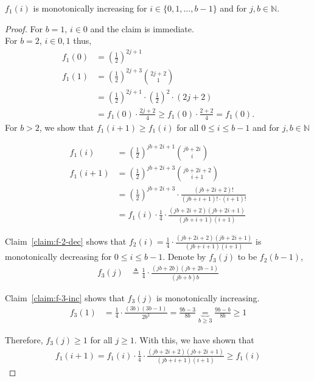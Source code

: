 \begin{claim}\label{claim:holes-pi-mono}
$f_1(i)$ is monotonically increasing for $i \in \{0,1,\dots,b-1\}$ and for $j,b \in \mathds{N}$. 
\end{claim}

\begin{proof}
For $b=1$, $i \in {0}$ and the claim is immediate.\\
For $b=2$, $i \in {0,1}$ thus,
\begin{align*}
    f_1(0) &= \left(\frac{1}{2}\right)^{2j+1} \\
    f_1(1) &= \left(\frac{1}{2}\right)^{2j+3} {{2j+2} \choose 1} \\
            &= \left(\frac{1}{2}\right)^{2j+1} \cdot \left(\frac{1}{2}\right)^{2} \cdot (2j+2)\\
            &= f_1(0) \cdot \frac{2j+2}{4} \geq f_1(0) \cdot \frac{2+2}{4} = f_1(0).
\end{align*}
For $b>2$, we show that $f_1(i+1)\geq f_1(i)$ for all $0 \leq i \leq b-1$ and for $j,b \in \mathds{N}$

\begin{align*}
    f_1(i) &= \left(\frac{1}{2}\right)^{jb + 2i +1} {{jb+2i} \choose {i}} \\
    f_1(i+1) &= \left(\frac{1}{2}\right)^{jb + 2i +3} {{jb+2i+2} \choose {i+1}} \\
    &= \left(\frac{1}{2}\right)^{jb + 2i +3} \cdot \frac{(jb+2i+2)!}{(jb+i+1)!\cdot(i+1)!} \\
    &= f_1(i) \cdot \frac{1}{4} \cdot \frac{(jb+2i+2)(jb+2i+1)}{(jb+i+1)(i+1)}
\end{align*}

Claim~\ref{claim:f-2-dec} shows that $f_2(i) = \frac{1}{4} \cdot \frac{(jb+2i+2)(jb+2i+1)}{(jb+i+1)(i+1)} $ is monotonically decreasing for $0\leq{i}\leq{b-1}$. 
Denote by $f_3(j)$ to be $f_2(b-1)$,
\begin{align}
    f_3(j) &\triangleq \frac{1}{4} \cdot \frac{(jb+2b)(jb+2b-1)}{(jb+b)b}
\end{align}

Claim~\ref{claim:f-3-inc} shows that $f_3(j)$ is monotonically increasing. 
\begin{align*}
    f_3(1) &= \frac{1}{4} \cdot \frac{(3b)(3b-1)}{2b^2} = \frac{9b-3}{8b} \underbrace{=}_{b\geq 3} \frac{9b-b}{8b} \geq 1
\end{align*}

Therefore, $f_3(j) \geq 1$ for all $j\geq1$.
With this, we have shown that 
\begin{align*}
f_1(i+1) = f_1(i) \cdot \frac{1}{4} \cdot \frac{(jb+2i+2)(jb+2i+1)}{(jb+i+1)(i+1)} \geq f_1(i)
\end{align*}

\end{proof}


